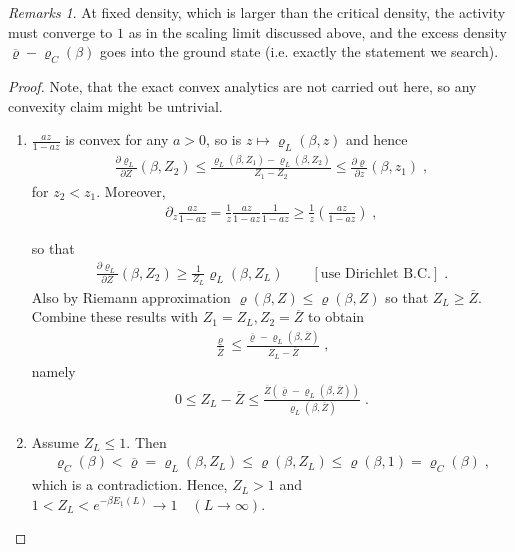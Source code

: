 \documentclass[
a4paper, %
11pt, %
onecolumn, %
openany, %
]{memoir}
\theoremstyle{definition}
\theoremstyle{remark}
\newtheorem{remarks}{Remarks}[chapter]
\theoremstyle{plain}
\begin{document}
\begin{remarks}
	At fixed density, which is larger than the critical density, the activity must converge to $1$ as in the scaling limit discussed above, and the excess density $\overline{\varrho}-\varrho_C(\beta)$ goes into the ground state (i.e. exactly the statement we search).
\end{remarks}
\begin{proof}
	Note, that the exact convex analytics are not carried out here, so any convexity claim might be untrivial.\begin{enumerate}
	\item $\frac{az}{1-az}$ is convex for any $a>0$, so is $z\mapsto \varrho_L(\beta,z)$ and hence \begin{align}
	\frac{\partial \varrho_L}{\partial Z}(\beta, Z_2)\leq \frac{\varrho_{L}(\beta,Z_1)-\varrho_L(\beta,Z_2)}{Z_1-Z_2}\leq \frac{\partial \varrho}{\partial z}(\beta,z_1)\;,
	\end{align}
	for $z_2<z_1$. Moreover, \begin{align}\partial_z\frac{az}{1-az}=\frac{1}{z}\frac{az}{1-az}\frac{1}{1-az}\geq \frac{1}{z}\left(\frac{az}{1-az}\right)\; ,\end{align}

so that \begin{align}
\frac{\partial \varrho_L}{\partial Z}(\beta,Z_2)\geq \frac{1}{Z_L}\varrho_L(\beta,Z_L)\qquad [\text{use Dirichlet B.C.}]\; .
\end{align}
Also by Riemann approximation $\varrho(\beta,Z)\leq \varrho(\beta,Z)$ so that $Z_L\geq \overline{Z}$.  Combine these results with $Z_1=Z_L, Z_2=\overline{Z}$ to obtain \begin{align}
\frac{\varrho}{\overline{Z}}\leq \frac{\overline{\varrho}-\varrho_{L}(\beta,\overline{Z})}{Z_L-\overline{Z}}\; ,
\end{align}
namely \begin{align}
0\leq Z_L-\overline{Z}\leq \frac{\overline{Z}(\overline{\varrho}-\varrho_{L}(\beta,\overline{Z}))}{\varrho_L(\beta,\overline{Z})}\;.
\end{align}
\item Assume $Z_L\leq 1$. Then \begin{align}
\varrho_C(\beta)<\overline{\varrho}=\varrho_L(\beta,Z_L)\leq \varrho(\beta,Z_L)\leq \varrho(\beta,1)=\varrho_C(\beta)\; ,
\end{align}
which is a contradiction. Hence, $Z_L>1$ and $1<Z_L<e^{-\beta E_{\underline{1}}(L)}\rightarrow 1 \quad (L\rightarrow\infty)$.
\end{enumerate}
\end{proof}
\end{document}
